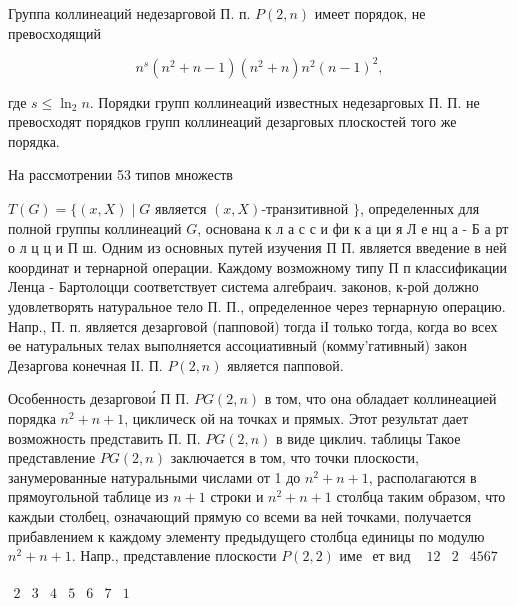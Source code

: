 \documentclass[10pt]{article}
\begin{document}
Группа коллинеаций недезарговой П. п. $P(2, n)$ имеет порядок, не превосходящий



\[

n^{s}\left(n^{2}+n-1\right)\left(n^{2}+n\right) n^{2}(n-1)^{2},

\]



где $s \leqslant \ln _{2} n$. Порядки групп коллинеаций известных недезарговых П. П. не превосходят порядков групп коллинеаций дезарговых плоскостей того же порядка.



На рассмотрении 53 типов множеств



$T(G)=\{(x, X) \mid G$ является $(x, X)$-транзитивной $\}$, определенных для полной группы коллинеаций $G$, основана к л а с с и фи к а ци я Л е нц а - Б а рт о л ц ц и П ш. Одним из основных путей изучения П П. является введение в ней координат и тернарной операции. Каждому возможному типу П п классификации Ленца - Бартолоцци соответствует система алгебраич. законов, к-рой должно удовлетворять натуральное тело П. П., определенное через тернарную операцию. Напр., П. п. является дезарговой (папповой) тогда іІ только тогда, когда во всех өе натуральных телах выполняется ассоциативный (комму'гативный) закон Дезаргова конечная ІІ. П. $P(2, n)$ является папповой.



Особенность дезарговои́ П П. $P G(2, n)$ в том, что она обладает коллинеацией порядка $n^{2}+n+1$, циклическ ой на точках и прямых. Этот результат дает возможность представить П. П. $P G(2, n)$ в виде циклич. таблицы Такое представление $P G(2, n)$ заключается в том, что точки плоскости, занумерованные натуральными числами от 1 до $n^{2}+n+1$, располагаются в прямоугольной таблице из $n+1$ строки и $n^{2}+n+1$ столбца таким образом, что каждыи столбец, означающий прямую со всеми ва ней точками, получается прибавлением к каждому элементу предыдущего столбца единицы по модулю $n^{2}+n+1$. Напр., представление плоскости $P(2,2)$ име$\begin{array}{lllllll}\text { ет вид } & 12 & 2 & 4567\end{array}$



$\begin{array}{llllllll}2 & 3 & 4 & 5 & 6 & 7 & 1\end{array}$
\end{document}
